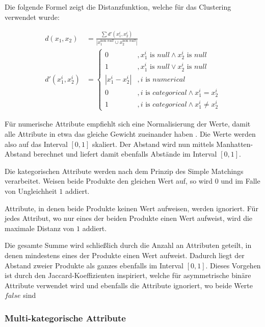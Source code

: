 Die folgende Formel zeigt die Distanzfunktion, welche für das Clustering
verwendet wurde:

\begin{align}
    d(x_1, x_2) &= \frac{\sum d'(x_1^i, x_2^i)}{|x_1^{\text{non }null} \cup x_2^{\text{non }null}|} \\
    d'(x_1^i, x_2^i) &= \begin{cases}
        0 &, x_1^i \text{ is } null \wedge x_2^i \text{ is } null \\
        1 &, x_1^i \text{ is } null \vee x_2^i \text{ is } null \\
        |x_1^i - x_2^i| &, i \text{ is } numerical \\
        0 &, i \text{ is } categorical \wedge x_1^i = x_2^i \\
        1 &, i \text{ is } categorical \wedge x_1^i \neq x_2^i
    \end{cases}
\end{align}

Für numerische Attribute empfiehlt sich eine Normalisierung der Werte,
damit alle Attribute in etwa das gleiche Gewicht zueinander haben
\autocite[ Kap. 1.2.1 Interval-Scaled Variables]{kaufman2009}. Die Werte
werden also auf das Interval \([0,1]\) skaliert. Der Abstand wird nun
mittels Manhatten-Abstand berechnet und liefert damit ebenfalls Abstände
im Interval \([0,1]\).

Die kategorischen Attribute werden nach dem Prinzip des Simple Matchings
verarbeitet. Weisen beide Produkte den gleichen Wert auf, so wird \(0\)
und im Falle von Ungleichheit \(1\) addiert.

Attribute, in denen beide Produkte keinen Wert aufweisen, werden
ignoriert. Für jedes Attribut, wo nur eines der beiden Produkte einen
Wert aufweist, wird die maximale Distanz von \(1\) addiert.

Die gesamte Summe wird schließlich durch die Anzahl an Attributen
geteilt, in denen mindestens eines der Produkte einen Wert aufweist.
Dadurch liegt der Abstand zweier Produkte als ganzes ebenfalls im
Interval \([0,1]\). Dieses Vorgehen ist durch den Jaccard-Koeffizienten
inspiriert, welche für asymmetrische binäre Attribute verwendet wird und
ebenfalls die Attribute ignoriert, wo beide Werte \(false\) sind
\autocite[siehe][ Kap. 1.2.4 Binary Variables]{kaufman2009}

\hypertarget{multi-kategorische-attribute}{%
\subsubsection{Multi-kategorische
Attribute}\label{multi-kategorische-attribute}}

